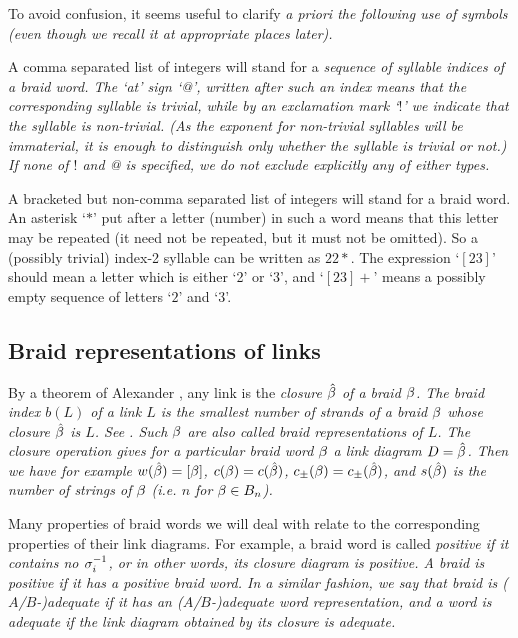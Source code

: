To avoid confusion, it seems useful to clarify \em{a priori}
the following use of symbols (even though we recall it at
appropriate places later).

A comma separated list of integers
will stand for a \em{sequence of syllable indices} of a braid word. 
The `at' sign `@', written after such an index means that the
corresponding syllable is trivial, while by an exclamation mark
`$!$' we indicate that the syllable is non-trivial. (As the
exponent for non-trivial syllables will be immaterial, it is
enough to distinguish only whether the syllable is trivial or not.)
If none of $!$ and @ is specified, we do not exclude explicitly
any of either types. 

A bracketed but non-comma separated list of integers will stand
for a braid word. An asterisk `$*$' put after a letter (number)
in such a word means that this letter may be repeated
(it need not be repeated, but it must not be omitted).
So a (possibly trivial) index-2 syllable can be written
as $22*$. The expression `$[23]$' should mean a letter which
is either `2' or `3', and `$[23]+$' means a possibly empty
sequence of letters `$2$' and `$3$'.

\subsection{Braid representations of links\label{brt}}

By a theorem of Alexander \cite{Alexander}, any link is the \em{closure}
$\hat{\beta}$ of a braid $\beta$. The \em{braid index} $b(L)$ of a link $L$
is the smallest number of strands of a braid $\beta$ whose closure
$\hat{\beta}$ is $L$. See \cite{Morton,WilFr,Murasugi}. Such $\beta$ are
also called \em{braid representations} of $L$. The closure operation
gives for a particular braid word $\beta$ a link diagram $D=\hat{\beta}$.
Then we have for example $w(\hat{\beta})=[\beta]$, $c(\beta)=c(\hat{\beta})$,
$c_\pm(\beta)=c_\pm(\hat{\beta})$, and $s(\hat{\beta})$
is the number of strings of $\beta$ (i.e. $n$ for $\beta\in B_n$).

Many properties of braid words we will deal with
relate to the corresponding properties of their link diagrams.
For example, a braid word is called \em{positive} if it contains no
$\sigma_i^{-1}$, or in other words, its closure diagram is positive.
A braid is positive if it has a positive braid word.
In a similar fashion, we say that braid is ($A$/$B$-)adequate if
it has an ($A$/$B$-)adequate word representation, and a word is
adequate if the link diagram obtained by its closure is adequate. 

